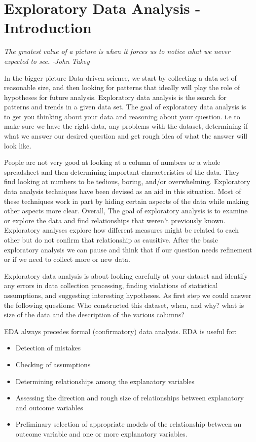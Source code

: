\documentclass[openany]{book}
\begin{document}
\section{Exploratory Data Analysis - Introduction}

\textit{The greatest value of a picture is when it forces us to notice what we never expected to see. -John Tukey}

In the bigger picture Data-driven science, we start by collecting a data set of reasonable size, and then looking for patterns that ideally will play the role of hypotheses for future analysis. Exploratory data analysis is the search for patterns and trends in a given data set. The goal of exploratory data analysis is to get you thinking about your data and reasoning about your question. i.e to make sure we have the right data, any problems with the dataset, determining if what we answer our desired question and get rough idea of what the answer will look like.

People are not very good at looking at a column of numbers or a whole spreadsheet and then determining important characteristics of the data. They find looking at numbers to be tedious, boring, and/or overwhelming. Exploratory data analysis techniques have been devised as an aid in this situation. Most of these techniques work in part by hiding certain aspects of the data while making other aspects more clear.
Overall, The goal of exploratory analysis is to examine or explore the data and find relationships that weren’t previously known. Exploratory analyses explore how different measures might be related to each other but do not confirm that relationship as causitive. After the basic exploratory analysis we can pause and think that if our question needs refinement or if we need to collect more or new data.

Exploratory data analysis is about looking carefully at your dataset and identify any errors in data collection processing, finding violations of statistical assumptions, and suggesting interesting hypotheses.
As first step we could answer the following questions: Who constructed this dataset, when, and why? what is size of the data and the description of the various columns?

EDA always precedes formal (confirmatory) data analysis. EDA is useful for:

\begin{itemize}

    \item Detection of mistakes
    \item Checking of assumptions
    \item Determining relationships among the explanatory variables
    \item Assessing the direction and rough size of relationships between explanatory and outcome variables
    \item Preliminary selection of appropriate models of the relationship between an outcome variable and one or more explanatory variables.

\end{itemize}
\end{document}
